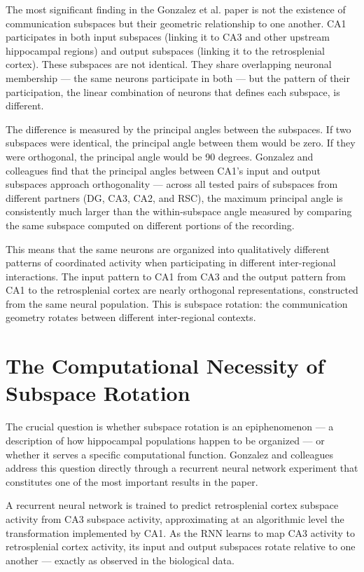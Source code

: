 \documentclass[12pt, a4paper, openany]{book}
\theoremstyle{definition}
\theoremstyle{remark}
\begin{document}
The most significant finding in the Gonzalez et al. paper is not the existence of communication subspaces but their geometric relationship to one another. CA1 participates in both input subspaces (linking it to CA3 and other upstream hippocampal regions) and output subspaces (linking it to the retrosplenial cortex). These subspaces are not identical. They share overlapping neuronal membership — the same neurons participate in both — but the pattern of their participation, the linear combination of neurons that defines each subspace, is different.

The difference is measured by the principal angles between the subspaces. If two subspaces were identical, the principal angle between them would be zero. If they were orthogonal, the principal angle would be 90 degrees. Gonzalez and colleagues find that the principal angles between CA1's input and output subspaces approach orthogonality — across all tested pairs of subspaces from different partners (DG, CA3, CA2, and RSC), the maximum principal angle is consistently much larger than the within-subspace angle measured by comparing the same subspace computed on different portions of the recording.

This means that the same neurons are organized into qualitatively different patterns of coordinated activity when participating in different inter-regional interactions. The input pattern to CA1 from CA3 and the output pattern from CA1 to the retrosplenial cortex are nearly orthogonal representations, constructed from the same neural population. This is subspace rotation: the communication geometry rotates between different inter-regional contexts.

\section{The Computational Necessity of Subspace Rotation}

The crucial question is whether subspace rotation is an epiphenomenon — a description of how hippocampal populations happen to be organized — or whether it serves a specific computational function. Gonzalez and colleagues address this question directly through a recurrent neural network experiment that constitutes one of the most important results in the paper.

A recurrent neural network is trained to predict retrosplenial cortex subspace activity from CA3 subspace activity, approximating at an algorithmic level the transformation implemented by CA1. As the RNN learns to map CA3 activity to retrosplenial cortex activity, its input and output subspaces rotate relative to one another — exactly as observed in the biological data.
\end{document}
